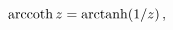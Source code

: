 \[\mathop{\mathrm{arccoth}\/}\nolimits z=\mathop{\mathrm{arctanh}\/}\nolimits\!%
\left(1/z\right),\]